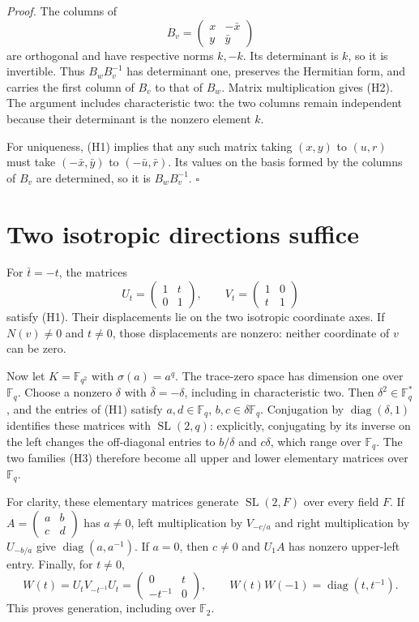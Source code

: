 \emph{Proof.}
The columns of
\[
 B_v=\begin{pmatrix}x&-\bar x\\y&\bar y\end{pmatrix}
\]
are orthogonal and have respective norms $k,-k$. Its determinant
is $k$, so it is invertible. Thus $B_wB_v^{-1}$ has determinant
one, preserves the Hermitian form, and carries the first column of
$B_v$ to that of $B_w$. Matrix multiplication gives (H2). The
argument includes characteristic two: the two columns remain
independent because their determinant is the nonzero element $k$.

For uniqueness, (H1) implies that any such matrix taking $(x,y)$
to $(u,r)$ must take $(-\bar x,\bar y)$ to
$(-\bar u,\bar r)$. Its values on the basis formed by the columns
of $B_v$ are determined, so it is $B_wB_v^{-1}$.
\hfill$\square$

\section{Two isotropic directions suffice}

For $\bar t=-t$, the matrices
\[
 U_t=\begin{pmatrix}1&t\\0&1\end{pmatrix},\qquad
 V_t=\begin{pmatrix}1&0\\t&1\end{pmatrix}                     \tag{H3}
\]
satisfy (H1). Their displacements lie on the two isotropic coordinate
axes. If $N(v)\ne0$ and $t\ne0$, those displacements are nonzero:
neither coordinate of $v$ can be zero.

Now let $K=\mathbb F_{q^2}$ with $\sigma(a)=a^q$. The trace-zero
space has dimension one over $\mathbb F_q$. Choose a nonzero
$\delta$ with $\bar\delta=-\delta$, including in characteristic
two. Then $\delta^2\in\mathbb F_q^*$, and the entries of (H1)
satisfy $a,d\in\mathbb F_q$, $b,c\in\delta\mathbb F_q$.
Conjugation by $\operatorname{diag}(\delta,1)$ identifies these
matrices with $\operatorname{SL}(2,q)$: explicitly, conjugating
by its inverse on the left changes the off-diagonal entries to
$b/\delta$ and $c\delta$, which range over $\mathbb F_q$.
The two families (H3) therefore become all upper and lower
elementary matrices over $\mathbb F_q$.

For clarity, these elementary matrices generate $\operatorname{SL}(2,F)$
over every field $F$. If
$A=\left(\begin{smallmatrix}a&b\\c&d\end{smallmatrix}\right)$
has $a\ne0$, left multiplication by $V_{-c/a}$ and right
multiplication by $U_{-b/a}$ give $\operatorname{diag}(a,a^{-1})$.
If $a=0$, then $c\ne0$ and $U_1A$ has nonzero upper-left entry.
Finally, for $t\ne0$,
\[
 W(t)=U_tV_{-t^{-1}}U_t=
 \begin{pmatrix}0&t\\-t^{-1}&0\end{pmatrix},\qquad
 W(t)W(-1)=\operatorname{diag}(t,t^{-1}).                     \tag{H4}
\]
This proves generation, including over $\mathbb F_2$.

